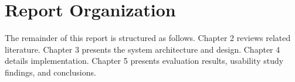 \section{Report Organization}

The remainder of this report is structured as follows. Chapter 2 reviews related literature. Chapter 3 presents the system architecture and design. Chapter 4 details implementation. Chapter 5 presents evaluation results, usability study findings, and conclusions.
